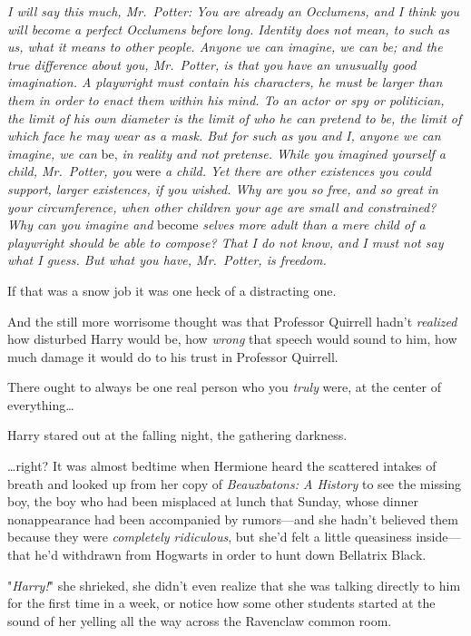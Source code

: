 \emph{I will say this much, Mr.~Potter: You are already an Occlumens, and I 
think you will become a perfect Occlumens before long. Identity does not mean, 
to such as us, what it means to other people. Anyone we can imagine, we can be; 
and the true difference about you, Mr.~Potter, is that you have an unusually 
good imagination. A playwright must contain his characters, he must be larger 
than them in order to enact them within his mind. To an actor or spy or 
politician, the limit of his own diameter is the limit of who he can pretend to 
be, the limit of which face he may wear as a mask. But for such as you and I, 
anyone we can imagine, we can} be,\emph{ in reality and not pretense. While you 
imagined yourself a child, Mr.~Potter, you} were\emph{ a child. Yet there are 
other existences you could support, larger existences, if you wished. Why are 
you so free, and so great in your circumference, when other children your age 
are small and constrained? Why can you imagine and} become\emph{ selves more 
adult than a mere child of a playwright should be able to compose? That I do 
not know, and I must not say what I guess. But what you have, Mr.~Potter, is 
freedom.}

If that was a snow job it was one heck of a distracting one.

And the still more worrisome thought was that Professor Quirrell hadn't 
\emph{realized} how disturbed Harry would be, how \emph{wrong} that speech 
would sound to him, how much damage it would do to his trust in Professor 
Quirrell.

There ought to always be one real person who you \emph{truly} were, at the 
center of everything{\ldots}

Harry stared out at the falling night, the gathering darkness.

{\ldots}right?
\sbreak
It was almost bedtime when Hermione heard the scattered intakes of breath and 
looked up from her copy of \emph{Beauxbatons: A History} to see the missing 
boy, the boy who had been misplaced at lunch that Sunday, whose dinner 
nonappearance had been accompanied by rumors---and she hadn't believed them 
because they were \emph{completely ridiculous}, but she'd felt a little 
queasiness inside---that he'd withdrawn from Hogwarts in order to hunt down 
Bellatrix Black.

"\emph{Harry!}" she shrieked, she didn't even realize that she was talking 
directly to him for the first time in a week, or notice how some other students 
started at the sound of her yelling all the way across the Ravenclaw common 
room.


